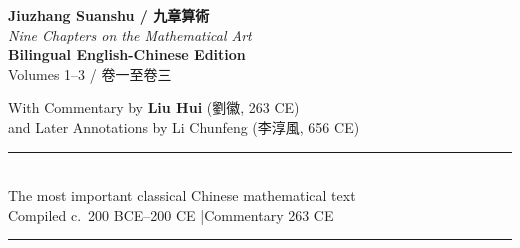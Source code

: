 \documentclass[10pt,a4paper]{article}
\begin{document}
\begin{titlepage}
\begin{center}
\vspace*{2cm}

{\Huge\bfseries\color{titlecolor} Jiuzhang Suanshu / 九章算術}\\[0.6cm]
{\Large\color{sectioncolor}\textit{Nine Chapters on the Mathematical Art}}\\[1.5cm]
{\Large\bfseries Bilingual English-Chinese Edition}\\[0.3cm]
{\large Volumes 1--3 / 卷一至卷三}\\[2cm]


\vspace{2cm}

{\large With Commentary by \textbf{Liu Hui} (劉徽, 263 CE)}\\[0.5cm]
{\large and Later Annotations by Li Chunfeng (李淳風, 656 CE)}\\[2cm]

\rule{0.6\textwidth}{0.8pt}\\[1cm]

{\small The most important classical Chinese mathematical text}\\[0.3cm]
{\small Compiled c.~200 BCE--200 CE \quad|\quad Commentary 263 CE}\\[1cm]


\vfill

\rule{0.4\textwidth}{0.4pt}

\end{center}
\end{titlepage}
\end{document}
